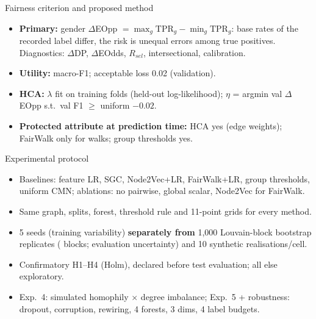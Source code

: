 \documentclass[aspectratio=169,11pt]{beamer}
\begin{document}
\begin{frame}{Fairness criterion and proposed method}
\begin{itemize}
\item \textbf{Primary:} gender $\Delta$EOpp $=\max_g\mathrm{TPR}_g-\min_g\mathrm{TPR}_g$: base rates of the recorded label differ, the risk is unequal errors among true positives. Diagnostics: $\Delta$DP, $\Delta$EOdds, $R_{sel}$, intersectional, calibration.
\item \textbf{Utility:} macro-F1; acceptable loss 0.02 (validation).
\item \textbf{HCA:} $\lambda$ fit on training folds (held-out log-likelihood); $\eta$ = argmin val $\Delta$EOpp s.t.\ val F1 $\ge$ uniform $-0.02$.
\item \textbf{Protected attribute at prediction time:} HCA yes (edge weights); FairWalk only for walks; group thresholds yes.
\end{itemize}
\end{frame}

\begin{frame}{Experimental protocol}
\begin{itemize}
\item Baselines: feature LR, SGC, Node2Vec+LR, FairWalk+LR, group thresholds, uniform CMN; ablations: no pairwise, global scalar, Node2Vec for FairWalk.
\item Same graph, splits, forest, threshold rule and 11-point grids for every method.
\item 5 seeds (training variability) \textbf{separately from} 1{,}000 Louvain-block bootstrap replicates (\RNBlocks{} blocks; evaluation uncertainty) and 10 synthetic realisations/cell.
\item Confirmatory H1--H4 (Holm), declared before test evaluation; all else exploratory.
\item Exp.~4: simulated homophily $\times$ degree imbalance; Exp.~5 + robustness: dropout, corruption, rewiring, 4 forests, 3 dims, 4 label budgets.
\end{itemize}
\end{frame}
\end{document}

